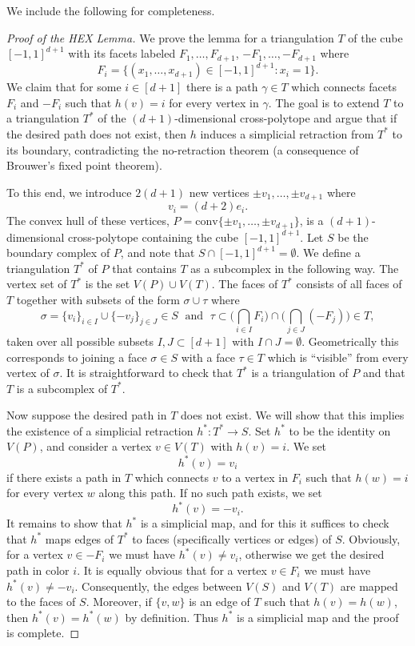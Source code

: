 \documentclass[12pt,a4paper,oneside]{amsart}\sloppy
\theoremstyle{definition}
\newcommand{\conv}{\mbox{conv}}
\begin{document}
We include the following for completeness.

\begin{proof}[Proof of the HEX Lemma] 
We prove the lemma for a triangulation $T$ of the cube $[-1,1]^{d+1}$ with its facets labeled  $F_1, \dots, F_{d+1}$, $-F_1, \dots, -F_{d+1}$ where 
\[F_i = \big\{ (x_1, \dots, x_{d+1}) \in [-1,1]^{d+1} : x_i = 1 \big\}.\]
We claim that for some $i\in [d+1]$ there is a path $\gamma \in T$ which connects facets $F_i$ and $-F_i$ such that $h(v) = i$ for every vertex in $\gamma$. 
The goal is to extend $T$ to a triangulation $T^*$ of the $(d+1)$-dimensional cross-polytope and argue that if the desired path does not exist, then $h$ induces a simplicial retraction from $T^*$ to its boundary, contradicting the no-retraction theorem (a consequence of Brouwer's fixed point theorem). 

To this end, we introduce $2(d+1)$ new vertices  $\pm v_1, \dots, \pm v_{d+1}$ where 
\[v_i = (d+2)e_i.\]
The convex hull of these vertices, $P = \conv \{\pm v_1, \dots, \pm v_{d+1}\} $, is a $(d+1)$-dimensional cross-polytope containing the cube $[-1,1]^{d+1}$. Let $S$ be the boundary complex of $P$, and note that $S\cap [-1,1]^{d+1} = \emptyset$. We define a triangulation $T^*$ of $P$ that contains $T$ as a subcomplex in the following way. The vertex set of $T^*$ is the set $V(P)\cup V(T)$. The faces of $T^*$ consists of all faces of $T$ together with subsets of the form $\sigma \cup \tau$ where
\[\sigma = \{v_i\}_{i\in I} \cup \{-v_j\}_{j\in J} \in S\; \text{ and } \; \textstyle \tau  \subset \big( \bigcap_{i\in I}F_i \big) \cap \big( \bigcap_{j\in J}(-F_j) \big) \in T,\]
taken over all possible subsets $I, J\subset [d+1]$ with $I\cap J = \emptyset$. Geometrically this corresponds to joining a face $\sigma \in S$ with a face $\tau\in T$ which is ``visible'' from every vertex of $\sigma$. It is straightforward to check that $T^*$ is a triangulation of $P$ and that $T$ is a subcomplex of $T^*$. 

Now suppose the desired path in $T$ does not exist. We will show that this implies the existence of a simplicial retraction $h^* \colon T^* \to S$. Set $h^*$ to be the identity on $V(P)$, and consider a vertex $v\in V(T)$ with $h(v) = i$. We set \[h^*(v) = v_i\] if there exists a path in $T$ which connects $v$ to a vertex in $F_i$ such that $h(w) = i$ for every vertex $w$ along this path. If no such path exists, we set 
\[h^*(v) = -v_i.\]
It remains to show that $h^*$ is a simplicial map, and for this it suffices to check that $h^*$ maps edges of $T^*$ to faces (specifically vertices or edges) of $S$. 
Obviously, for a vertex $v\in -F_i$ we must have $h^*(v) \neq v_i$, otherwise we get the desired path in color $i$. 
It is equally obvious that for a vertex $v\in F_i$ we must have $h^*(v)\neq -v_i$.
Consequently, the edges between $V(S)$ and $V(T)$ are mapped to the faces of $S$.   
Moreover, if $\{v,w\}$ is an edge of $T$ such that $h(v) = h(w)$, then $h^*(v) = h^*(w)$ by definition. 
Thus $h^*$ is a simplicial map and the proof is complete.
\end{proof}
\end{document}
